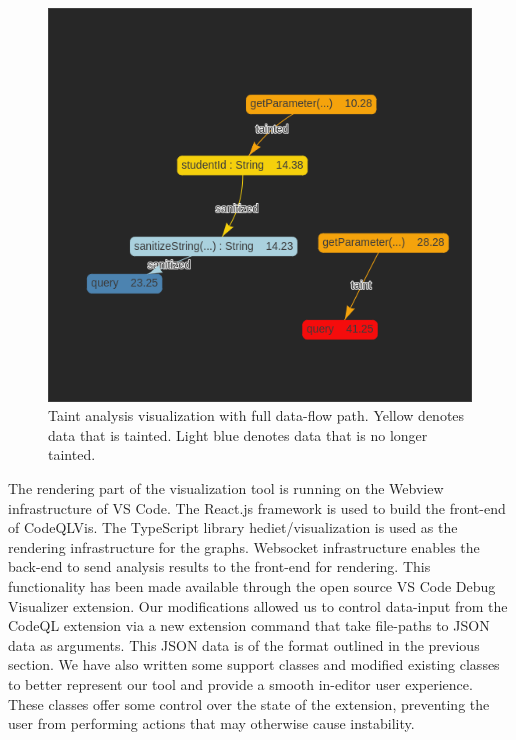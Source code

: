 \documentclass[sigplan,10pt,review]{acmart}
\begin{document}
\begin{figure}[h]
  \centering
  \includegraphics[width=\linewidth]{taint_full}
  \caption{Taint analysis visualization with full data-flow path. Yellow denotes data that is tainted. Light blue denotes data that is no longer tainted.}
\end{figure}

The rendering part of the visualization tool is running on the Webview infrastructure of VS Code. The React.js framework is used to build the front-end of CodeQLVis. The TypeScript library hediet/visualization is used as the rendering infrastructure for the graphs. Websocket infrastructure enables the back-end to send analysis results to the front-end for rendering.
\newline
\indent This functionality has been made available through the open source VS Code Debug Visualizer extension. Our modifications allowed us to control data-input from the CodeQL extension via a new extension command that take file-paths to JSON data as arguments. This JSON data is of the format outlined in the previous section.
\newline
\indent We have also written some support classes and modified existing classes to better represent our tool and provide a smooth in-editor user experience. These classes offer some control over the state of the extension, preventing the user from performing actions that may otherwise cause instability.
\end{document}
